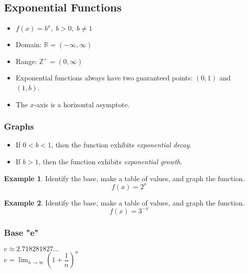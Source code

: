 \documentclass[addpoints,12pt]{exam}
\theoremstyle{definition}
\theoremstyle{break}
\theoremstyle{break}
\newtheorem{example}{Example}[subsection]
\begin{document}
\setcounter{section}{12}
\setcounter{subsection}{0}

\subsection{Exponential Functions}
\vspace{.15in}

\begin{definition}\mbox{}
\vspace{-.15in}
\begin{itemize}
\item $f(x) = b^x,\; b> 0,\; b\neq 1$
\item Domain: $\mathbb{R} = (-\infty,\infty)$
\item Range: $\mathbb{Z}^+ = (0,\infty)$
\item Exponential functions always have two guaranteed points: $(0,1)$ and $(1,b)$.
\item The $x$-axis is a horizontal asymptote.
\end{itemize}
\end{definition}
\vspace{.15in}

\subsubsection*{Graphs}
\begin{itemize}
\item If $0 < b < 1$, then the function exhibits \emph{exponential decay}.
\item If $b > 1$, then the function exhibits \emph{exponential growth}.
\end{itemize}

\newpage

\begin{example}
Identify the base, make a table of values, and graph the function.
\[f(x) = 2^x\]
\vspace{3.25in}
\end{example}
\begin{example}
Identify the base, make a table of values, and graph the function.
\[f(x) = 3^{-x}\]
\end{example}

\newpage

\subsubsection*{Base "e"}
\vspace{.15in}
\begin{definition}
$e \approx 2.718281827\dots$\\
$e = \lim_{n\rightarrow\infty}\left(1+\dfrac{1}{n}\right)^n$
\end{definition}
\end{document}
